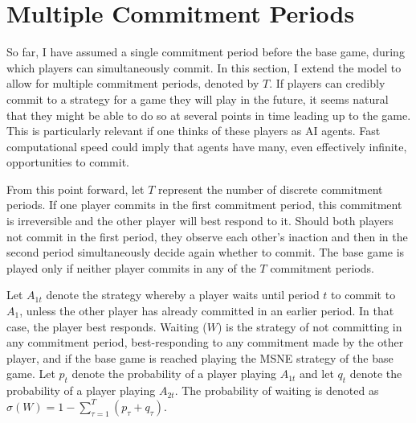\documentclass[main.tex]{subfiles}
\begin{document}
\section{Multiple Commitment Periods}\label{sec:convergence}
So far, I have assumed a single commitment period before the base game, during which players can simultaneously commit. In this section, I extend the model to allow for multiple commitment periods, denoted by $T$. If players can credibly commit to a strategy for a game they will play in the future, it seems natural that they might be able to do so at several points in time leading up to the game. This is particularly relevant if one thinks of these players as AI agents. Fast computational speed could imply that agents have many, even effectively infinite, opportunities to commit.
 
 
From this point forward, let $T$ represent the number of discrete commitment periods. If one player commits in the first commitment period, this commitment is irreversible and the other player will best respond to it. Should both players not commit in the first period, they observe each other’s inaction and then in the second period simultaneously decide again whether to commit. The base game is played only if neither player commits in any of the $T$ commitment periods. 

Let $A_{1t}$ denote the strategy whereby a player waits until period $t$ to commit to $A_1$, unless the other player has already committed in an earlier period. In that case, the player best responds. Waiting ($W$) is the strategy of not committing in any commitment period, best-responding to any commitment made by the other player, and if the base game is reached playing the MSNE strategy of the base game. 
Let $p_{t}$ denote the probability of a player playing $A_{1t}$ and let $q_t$ denote the probability of a player playing $A_{2t}$. The probability of waiting is denoted as $\sigma(W)=1-\sum_{\tau=1}^{T}(p_\tau+q_\tau)$.  
 
\end{document}
